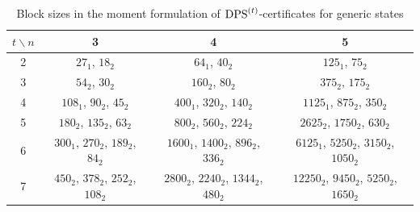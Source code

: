 \documentclass[11pt]{article}
\newcommand{\DPS}{\text{\rm DPS}}
\theoremstyle{plain}
\begin{document}
\begin{table}[h!]
    \centering
    \begin{tabular}{c|c|c|c}
         $t\backslash n$ & 3 & 4 & 5 \\ \hline
         2 & $27_1$, $18_2$ & $64_1$, $40_2$ & $125_1$, $75_2$ \\ \hline
         3 & $54_2$, $30_2$ & $160_2$, $80_2$ & $375_2$, $175_2$ \\ \hline
         4 & $108_1$, $90_2$, $45_2$ & $400_1$, $320_2$, $140_2$ & $1125_1$, $875_2$, $350_2$\\\hline
         5 & $180_2$, $135_2$, $63_2$ & $800_2$, $560_2$, $224_2$ & $2625_2$, $1750_2$, $630_2$\\\hline
         6 & $300_1$, $270_2$, $189_2$, $84_2$ & $1600_1$, $1400_2$, $896_2$, $336_2$ & $6125_1$, $5250_2$, $3150_2$, $1050_2$\\\hline
         7 & $450_2$, $378_2$, $252_2$, $108_2$ & $2800_2$, $2240_2$, $1344_2$, $480_2$ & $12250_2$, $9450_2$, $5250_2$, $1650_2$
    \end{tabular}
    \caption{Block sizes in the moment formulation of $\DPS^{(t)}$-certificates for generic states}
    \label{tab:GenericBlockSize}
\end{table}
\end{document}
